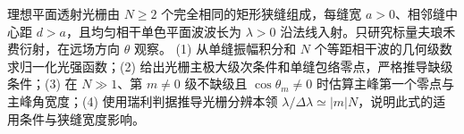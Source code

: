 理想平面透射光栅由 \(N\ge2\) 个完全相同的矩形狭缝组成，每缝宽 \(a>0\)、相邻缝中心距 \(d>a\)，且均匀相干单色平面波波长为 \(\lambda>0\) 沿法线入射。只研究标量夫琅禾费衍射，在远场方向 \(\theta\) 观察。
(1) 从单缝振幅积分和 \(N\) 个等距相干波的几何级数求归一化光强函数；(2) 给出光栅主极大级次条件和单缝包络零点，严格推导缺级条件；(3) 在 \(N\gg1\)、第 \(m\ne0\) 级不缺级且 \(\cos\theta_m\ne0\) 时估算主峰第一个零点与主峰角宽度；(4) 使用瑞利判据推导光栅分辨本领 \(\lambda/\Delta\lambda\simeq |m|N\)，说明此式的适用条件与狭缝宽度影响。
